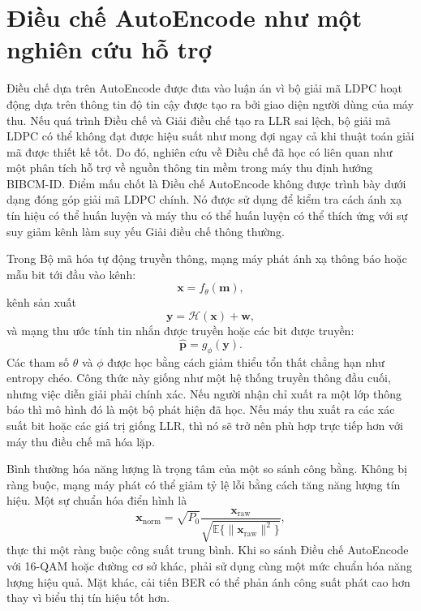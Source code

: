 \section{Điều chế AutoEncode như một nghiên cứu hỗ trợ}
Điều chế dựa trên AutoEncode được đưa vào luận án vì bộ giải mã LDPC hoạt động dựa trên thông tin độ tin cậy được tạo ra bởi giao diện người dùng của máy thu. Nếu quá trình Điều chế và Giải điều chế tạo ra LLR sai lệch, bộ giải mã LDPC có thể không đạt được hiệu suất như mong đợi ngay cả khi thuật toán giải mã được thiết kế tốt. Do đó, nghiên cứu về Điều chế đã học có liên quan như một phân tích hỗ trợ về nguồn thông tin mềm trong máy thu định hướng BIBCM-ID. Điểm mấu chốt là Điều chế AutoEncode không được trình bày dưới dạng đóng góp giải mã LDPC chính. Nó được sử dụng để kiểm tra cách ánh xạ tín hiệu có thể huấn luyện và máy thu có thể huấn luyện có thể thích ứng với sự suy giảm kênh làm suy yếu Giải điều chế thông thường.

Trong Bộ mã hóa tự động truyền thông, mạng máy phát ánh xạ thông báo hoặc mẫu bit tới đầu vào kênh:
\begin{equation}
  \mathbf{x}=f_\theta(\mathbf{m}),
\end{equation}
kênh sản xuất
\begin{equation}
  \mathbf{y}=\mathcal{H}(\mathbf{x})+\mathbf{w},
\end{equation}
và mạng thu ước tính tin nhắn được truyền hoặc các bit được truyền:
\begin{equation}
  \hat{\mathbf{p}}=g_\phi(\mathbf{y}).
\end{equation}
Các tham số $\theta$ và $\phi$ được học bằng cách giảm thiểu tổn thất chẳng hạn như entropy chéo. Công thức này giống như một hệ thống truyền thông đầu cuối, nhưng việc diễn giải phải chính xác. Nếu người nhận chỉ xuất ra một lớp thông báo thì mô hình đó là một bộ phát hiện đã học. Nếu máy thu xuất ra các xác suất bit hoặc các giá trị giống LLR, thì nó sẽ trở nên phù hợp trực tiếp hơn với máy thu điều chế mã hóa lặp.

Bình thường hóa năng lượng là trọng tâm của một so sánh công bằng. Không bị ràng buộc, mạng máy phát có thể giảm tỷ lệ lỗi bằng cách tăng năng lượng tín hiệu. Một sự chuẩn hóa điển hình là
\begin{equation}
  \mathbf{x}_{\mathrm{norm}}
  =
  \sqrt{P_0}
  \frac{\mathbf{x}_{\mathrm{raw}}}
  {\sqrt{\mathbb{E}\{\|\mathbf{x}_{\mathrm{raw}}\|^2\}}},
\end{equation}
thực thi một ràng buộc công suất trung bình. Khi so sánh Điều chế AutoEncode với 16-QAM hoặc đường cơ sở khác, phải sử dụng cùng một mức chuẩn hóa năng lượng hiệu quả. Mặt khác, cải tiến BER có thể phản ánh công suất phát cao hơn thay vì biểu thị tín hiệu tốt hơn.

